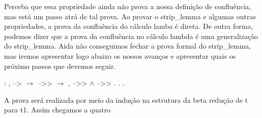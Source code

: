  Perceba que essa propriedade ainda não prova a nossa definição de confluência, mas está um passo
atrá de tal prova. Ao provar o strip\_lemma e algumas outras propriedades, a prova da confluência do cálculo
lamba é direta. De outra forma, podemos dizer que a prova da confluência no cálculo lambda é uma 
generalização do strip\_lemma. Aida não conseguimos fechar a prova formal do strip\_lemma, mas iremos
apresentar logo abaixo os nossos avanços e apresentar quais os próximo passos que devemos seguir.\begin{coqdoccode}
\coqdocemptyline
\coqdocnoindent
{} : \coqdockw{\ensuremath{\forall}}    ,  -->  \ensuremath{\rightarrow}  -->>  \ensuremath{\rightarrow} \coqdoctac{\ensuremath{\exists}} ,  -->>  \ensuremath{\land}  -->> .\coqdoceol
\coqdocnoindent
{}.\coqdoceol
\coqdocindent{1.00em}
     .\coqdoceol
\coqdocemptyline
\end{coqdoccode}
A prova será realizada por meio da indução na estrutura da beta redução de t para t1. Assim chegamos a quatro
